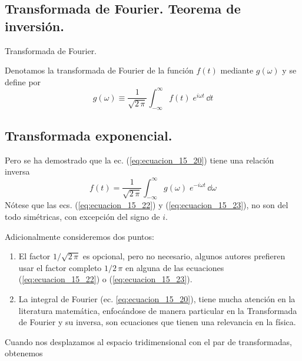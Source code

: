 \subsection{Transformada de Fourier. Teorema de inversión.}
\begin{defi}{Transformada de Fourier.}

Denotamos la transformada de Fourier de la función $f(t)$ mediante $g(\omega)$ y se define por
\begin{equation}
g (\omega) \equiv \dfrac{1}{\sqrt{2 \, \pi}} \int_{-\infty}^{\infty} f(t) \; e^{i \omega t} \, \dd{t}
\label{eq:ecuacion_15_22}
\end{equation}
\end{defi}
\subsection*{Transformada exponencial.}
Pero se ha demostrado que la ec. (\ref{eq:ecuacion_15_20}) tiene una relación inversa 
\begin{equation}
f(t) = \dfrac{1}{\sqrt{2 \, \pi}} \int_{-\infty}^{\infty} g(\omega) \; e^{-i \omega t} \, \dd{\omega}
\label{eq:ecuacion_15_23}
\end{equation}
Nótese que las ecs. (\ref{eq:ecuacion_15_22}) y (\ref{eq:ecuacion_15_23}), no son del todo simétricas, con excepción del signo de $i$.
\par
Adicionalmente consideremos dos puntos: 
\begin{enumerate}
\item  El factor $1/\sqrt{2 \, \pi}$ es opcional, pero no necesario, algunos autores prefieren usar el factor completo $1/2 \, \pi$ en alguna de las ecuaciones (\ref{eq:ecuacion_15_22}) o (\ref{eq:ecuacion_15_23}).
\item La integral de Fourier (ec. \ref{eq:ecuacion_15_20}), tiene mucha atención en la literatura matemática, enfocándose de manera particular en la Transformada de Fourier y su inversa, son ecuaciones que tienen una relevancia en la física.
\end{enumerate}
Cuando nos desplazamos al espacio tridimensional con el par de transformadas, obtenemos
